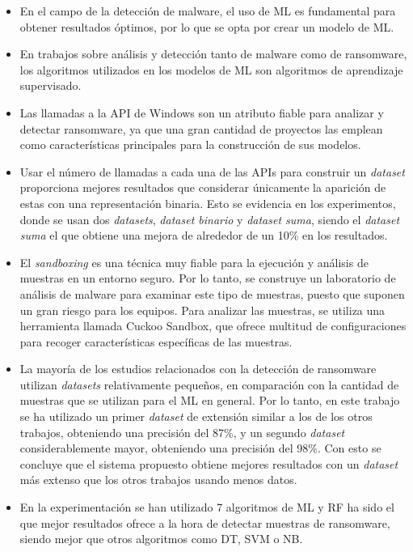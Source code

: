 \begin{itemize}
    \item En el campo de la detección de malware, el uso de \gls{ML} es fundamental para obtener resultados óptimos, por lo que se opta por crear un modelo de \gls{ML}.
    \item En trabajos sobre análisis y detección tanto de malware como de ransomware, los algoritmos utilizados en los modelos de \gls{ML} son algoritmos de aprendizaje supervisado.
    \item Las llamadas a la \gls{API} de Windows son un atributo fiable para analizar y detectar ransomware, ya que una gran cantidad de proyectos las emplean como características principales para la construcción de sus modelos.
    \item Usar el número de llamadas a cada una de las \gls{API}s para construir un \textit{dataset} proporciona mejores resultados que considerar únicamente la aparición de estas con una representación binaria. Esto se evidencia en los experimentos, donde se usan dos \textit{datasets}, \textit{dataset binario} y \textit{dataset suma}, siendo el \textit{dataset suma} el que obtiene una mejora de alrededor de un 10\% en los resultados.
    \item El \textit{sandboxing} es una técnica muy fiable para la ejecución y análisis de muestras en un entorno seguro. Por lo tanto, se construye un laboratorio de análisis de malware para examinar este tipo de muestras, puesto que suponen un gran riesgo para los equipos. Para analizar las muestras, se utiliza una herramienta llamada Cuckoo Sandbox, que ofrece multitud de configuraciones para recoger características específicas de las muestras.
    \item La mayoría de los estudios relacionados con la detección de ransomware utilizan \textit{datasets} relativamente pequeños, en comparación con la cantidad de muestras que se utilizan para el \gls{ML} en general. Por lo tanto, en este trabajo se ha utilizado un primer \textit{dataset} de extensión similar a los de los otros trabajos, obteniendo una precisión del 87\%, y un segundo \textit{dataset} considerablemente mayor, obteniendo una precisión del 98\%. Con esto se concluye que el sistema propuesto obtiene mejores resultados con un \textit{dataset} más extenso que los otros trabajos usando menos datos.
    \item En la experimentación se han utilizado 7 algoritmos de \gls{ML} y \gls{RF} ha sido el que mejor resultados ofrece a la hora de detectar muestras de ransomware, siendo mejor que otros algoritmos como \gls{DT}, \gls{SVM} o \gls{NB}.

\end{itemize}


